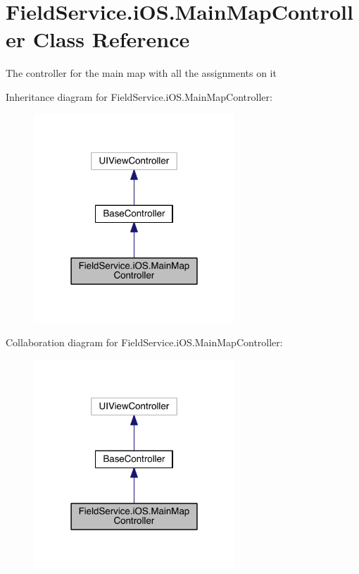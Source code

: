 \hypertarget{class_field_service_1_1i_o_s_1_1_main_map_controller}{\section{Field\+Service.\+i\+O\+S.\+Main\+Map\+Controller Class Reference}
\label{class_field_service_1_1i_o_s_1_1_main_map_controller}
}


The controller for the main map with all the assignments on it  




Inheritance diagram for Field\+Service.\+i\+O\+S.\+Main\+Map\+Controller\+:
\nopagebreak
\begin{figure}[H]
\begin{center}
\leavevmode
\includegraphics[width=214pt]{class_field_service_1_1i_o_s_1_1_main_map_controller__inherit__graph}
\end{center}
\end{figure}


Collaboration diagram for Field\+Service.\+i\+O\+S.\+Main\+Map\+Controller\+:
\nopagebreak
\begin{figure}[H]
\begin{center}
\leavevmode
\includegraphics[width=214pt]{class_field_service_1_1i_o_s_1_1_main_map_controller__coll__graph}
\end{center}
\end{figure}
